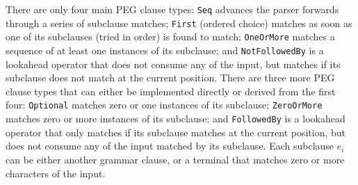 \documentclass[manuscript]{acmart}
\begin{document}
There are only four main PEG clause types: \texttt{Seq} advances the parser forwards through a series of subclause matches; \texttt{First} (ordered choice) matches as soon as one of its subclauses (tried in order) is found to match; \texttt{OneOrMore} matches a sequence of at least one instances of its subclause; and \texttt{NotFollowedBy} is a lookahead operator that does not consume any of the input, but matches if its subclause does not match at the current position. There are three more PEG clause types that can either be implemented directly or derived from the first four: \texttt{Optional} matches zero or one instances of its subclause; \texttt{ZeroOrMore} matches zero or more instances of its subclause; and \texttt{FollowedBy} is a lookahead operator that only matches if its subclause matches at the current position, but does not consume any of the input matched by its subclause. Each subclause $e_i$ can be either another grammar clause, or a terminal that matches zero or more characters of the input.
\end{document}
